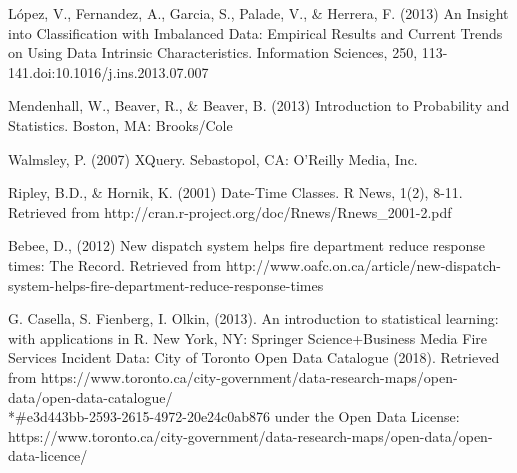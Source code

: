 \documentclass[12pt,letterpaper, oneside]
{article}
\begin{document}
{\medskip López, V., Fernandez, A., Garcia, S., Palade, V.,  \& Herrera, F. (2013) An Insight into Classification with Imbalanced Data: Empirical Results and Current Trends on Using Data Intrinsic Characteristics. Information Sciences, 250, 113-141.doi:10.1016/j.ins.2013.07.007

\medskip Mendenhall, W., Beaver, R., \& Beaver, B. (2013) Introduction to Probability and Statistics. Boston, MA: Brooks/Cole

\medskip Walmsley, P. (2007) XQuery. Sebastopol, CA: O’Reilly Media, Inc. 

\medskip Ripley, B.D., \& Hornik, K. (2001) Date-Time Classes. R News, 1(2), 8-11. Retrieved from http://cran.r-project.org/doc/Rnews/Rnews\_2001-2.pdf 

\medskip Bebee, D., (2012) New dispatch system helps fire department reduce response times: The Record. Retrieved from http://www.oafc.on.ca/article/new-dispatch-system-helps-fire-department-reduce-response-times

\medskip G. Casella, S. Fienberg, I. Olkin, (2013). An introduction to statistical learning: with applications in R. New York, NY: Springer Science+Business Media
Fire Services Incident Data: City of Toronto Open Data Catalogue (2018). Retrieved from https://www.toronto.ca/city-government/data-research-maps/open-data/open-data-catalogue/\\*\#e3d443bb-2593-2615-4972-20e24c0ab876 under the Open Data License: https://www.toronto.ca/city-government/data-research-maps/open-data/open-data-licence/

}
\end{document}
